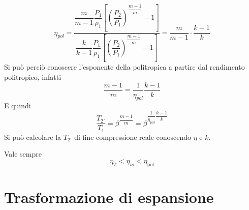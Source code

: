 \begin{adjustwidth}{2in}{}
\begin{itemize}
		\[\eta_{pol} = \dfrac{\dfrac{m}{m-1} \dfrac{P_1}{\rho_1}\left[\left(\dfrac{P_2}{P_1}\right)^{\dfrac{m-1}{m}}-1\right]}{\dfrac{k}{k-1}\dfrac{P_1}{\rho_1}\left[\left(\dfrac{P_2}{P_1}\right)^{\dfrac{m-1}{m}}-1\right]} = \dfrac{m}{m-1}\cdot\dfrac{k-1}{k}\]
		Si può perciò conoscere l'esponente della politropica a partire dal rendimento politropico, infatti
		\[\dfrac{m-1}{m}= \dfrac{1}{\eta_{pol}}\dfrac{k-1}{k}\]
		E quindi
		\[\dfrac{T_{2'}}{T_1} = \beta^{\dfrac{m-1}{m}} = \beta^{ \dfrac{1}{\eta_{pol}}\dfrac{k-1}{k}}\]
		Si può calcolare la $T_{2'}$ di fine compressione reale conoscendo $\eta$ e $k$. 
	\end{itemize}
	Vale sempre 
	\[\eta_T<\eta_{is}<\eta_\text{pol}\]
\end{adjustwidth}




\section{Trasformazione di espansione}
